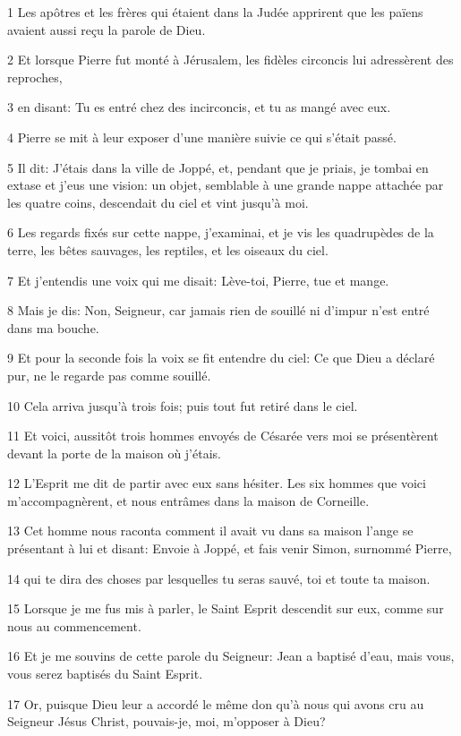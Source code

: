 \par 1 Les apôtres et les frères qui étaient dans la Judée apprirent que les païens avaient aussi reçu la parole de Dieu.
\par 2 Et lorsque Pierre fut monté à Jérusalem, les fidèles circoncis lui adressèrent des reproches,
\par 3 en disant: Tu es entré chez des incirconcis, et tu as mangé avec eux.
\par 4 Pierre se mit à leur exposer d'une manière suivie ce qui s'était passé.
\par 5 Il dit: J'étais dans la ville de Joppé, et, pendant que je priais, je tombai en extase et j'eus une vision: un objet, semblable à une grande nappe attachée par les quatre coins, descendait du ciel et vint jusqu'à moi.
\par 6 Les regards fixés sur cette nappe, j'examinai, et je vis les quadrupèdes de la terre, les bêtes sauvages, les reptiles, et les oiseaux du ciel.
\par 7 Et j'entendis une voix qui me disait: Lève-toi, Pierre, tue et mange.
\par 8 Mais je dis: Non, Seigneur, car jamais rien de souillé ni d'impur n'est entré dans ma bouche.
\par 9 Et pour la seconde fois la voix se fit entendre du ciel: Ce que Dieu a déclaré pur, ne le regarde pas comme souillé.
\par 10 Cela arriva jusqu'à trois fois; puis tout fut retiré dans le ciel.
\par 11 Et voici, aussitôt trois hommes envoyés de Césarée vers moi se présentèrent devant la porte de la maison où j'étais.
\par 12 L'Esprit me dit de partir avec eux sans hésiter. Les six hommes que voici m'accompagnèrent, et nous entrâmes dans la maison de Corneille.
\par 13 Cet homme nous raconta comment il avait vu dans sa maison l'ange se présentant à lui et disant: Envoie à Joppé, et fais venir Simon, surnommé Pierre,
\par 14 qui te dira des choses par lesquelles tu seras sauvé, toi et toute ta maison.
\par 15 Lorsque je me fus mis à parler, le Saint Esprit descendit sur eux, comme sur nous au commencement.
\par 16 Et je me souvins de cette parole du Seigneur: Jean a baptisé d'eau, mais vous, vous serez baptisés du Saint Esprit.
\par 17 Or, puisque Dieu leur a accordé le même don qu'à nous qui avons cru au Seigneur Jésus Christ, pouvais-je, moi, m'opposer à Dieu?
